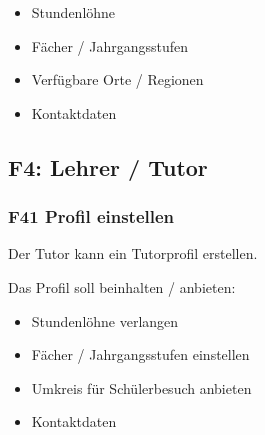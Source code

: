 \documentclass[10pt,a4paper]{scrartcl}
\begin{document}
\begin{itemize}
	\item Stundenlöhne
	\item Fächer / Jahrgangsstufen
	\item Verfügbare Orte / Regionen
	\item Kontaktdaten
\end{itemize}



\subsection{F4: Lehrer / Tutor}
\subsubsection*{F41 Profil einstellen}
Der Tutor kann ein Tutorprofil erstellen.

Das Profil soll beinhalten / anbieten:
\begin{itemize}
	\item Stundenlöhne verlangen
	\item Fächer / Jahrgangsstufen einstellen
	\item Umkreis für Schülerbesuch anbieten
	\item Kontaktdaten
\end{itemize}

%

%
\end{document}
